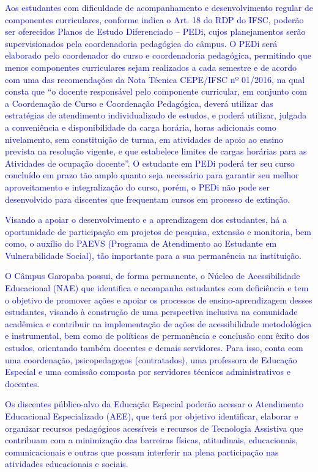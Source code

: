 \documentclass{../../modelos/latex-shared/ifsc-ppc}
\newcommand{\revisao}[1]{\textcolor{blue}{#1}}
\newcommand{\revisao}[1]{#1}
\begin{document}
\revisao{Aos estudantes com dificuldade de acompanhamento e desenvolvimento regular de componentes curriculares, conforme indica o Art. 18 do RDP do IFSC, poderão ser oferecidos Planos de Estudo Diferenciado -- PEDi, cujos planejamentos serão supervisionados pela coordenadoria pedagógica do câmpus. O PEDi será elaborado pelo coordenador do curso e coordenadoria pedagógica, permitindo que menos componentes curriculares sejam realizados a cada semestre e de acordo com uma das recomendações da Nota Técnica CEPE/IFSC nº 01/2016, na qual consta que ``o docente responsável pelo componente curricular, em conjunto com a Coordenação de Curso e Coordenação Pedagógica, deverá utilizar das estratégias de atendimento individualizado de estudos, e poderá utilizar, julgada a conveniência e disponibilidade da carga horária, horas adicionais como nivelamento, sem constituição de turma, em atividades de apoio ao ensino prevista na resolução vigente, e que estabelece limites de cargas horárias para as Atividades de ocupação docente''. O estudante em PEDi poderá ter seu curso concluído em prazo tão amplo quanto seja necessário para garantir seu melhor aproveitamento e integralização do curso, porém, o PEDi não pode ser desenvolvido para discentes que frequentam cursos em processo de extinção.}

\revisao{Visando a apoiar o desenvolvimento e a aprendizagem dos estudantes, há a oportunidade de participação em projetos de pesquisa, extensão e monitoria, bem como, o auxílio do PAEVS (Programa de Atendimento ao Estudante em Vulnerabilidade Social), tão importante para a sua permanência na instituição.}

\revisao{O Câmpus Garopaba possui, de forma permanente, o Núcleo de Acessibilidade Educacional (NAE) que identifica e acompanha estudantes com deficiência e tem o objetivo de promover ações e apoiar os processos de ensino-aprendizagem desses estudantes, visando à construção de uma perspectiva inclusiva na comunidade acadêmica e contribuir na implementação de ações de acessibilidade metodológica e instrumental, bem como de políticas de permanência e conclusão com êxito dos estudos, orientando também docentes e demais servidores. Para isso, conta com uma coordenação, psicopedagogos (contratados), uma professora de Educação Especial e uma comissão composta por servidores técnicos administrativos e docentes.}

\revisao{Os discentes público-alvo da Educação Especial poderão acessar o Atendimento Educacional Especializado (AEE), que terá por objetivo identificar, elaborar e organizar recursos pedagógicos acessíveis e recursos de Tecnologia Assistiva que contribuam com a minimização das barreiras físicas, atitudinais, educacionais, comunicacionais e outras que possam interferir na plena participação nas atividades educacionais e sociais.}
\end{document}
